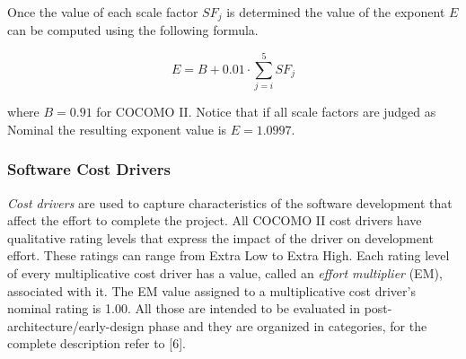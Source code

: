 Once the value of each scale factor $SF_{j}$ is determined the value
of the exponent $E$ can be computed using the following formula.

\[
E=B+0.01\cdot\sum_{j=i}^{5}SF_{j}
\]


where $B=0.91$ for COCOMO II. Notice that if all scale factors are
judged as Nominal the resulting exponent value is $E=1.0997$.


\subsubsection{Software Cost Drivers}

\emph{Cost drivers} are used to capture characteristics of the software
development that affect the effort to complete the project. All COCOMO
II cost drivers have qualitative rating levels that express the impact
of the driver on development effort. These ratings can range from
Extra Low to Extra High. Each rating level of every multiplicative
cost driver has a value, called an \emph{effort multiplier} (EM),
associated with it. The EM value assigned to a multiplicative cost
driver's nominal rating is 1.00. All those are intended to be evaluated
in post-architecture/early-design phase and they are organized in
categories, for the complete description refer to {[}6{]}.
